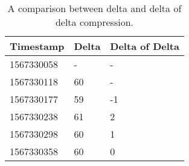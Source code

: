 \begin{table}[]
\centering
\begin{tabular}{l|l|l}
\textbf{Timestamp}  & \textbf{Delta} & \textbf{Delta of Delta} \\ \hline
1567330058 & -     & -              \\
1567330118 & 60    & -              \\
1567330177 & 59    & -1             \\
1567330238 & 61    & 2              \\
1567330298 & 60    & 1              \\
1567330358 & 60    & 0              \\
\end{tabular}
\caption{A comparison between delta and delta of delta compression.}
\label{tab:delta}
\end{table}

